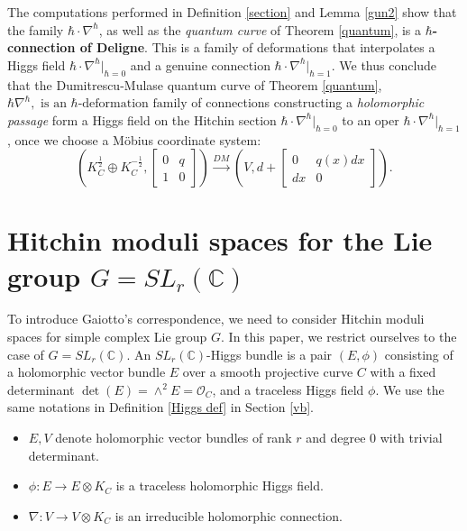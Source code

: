\documentclass[oneside, 11pt]{amsart}
\theoremstyle{definition}
\numberwithin{equation}{subsection}
\begin{document}
The computations performed in Definition \ref{section} and Lemma \ref{gun2} show that the family $\hbar \cdot \nabla^{\hbar}$, as well as the \textit{quantum curve} of Theorem \ref{quantum}, is a \textbf{$\hbar$-connection of Deligne}.  This is a family of deformations that interpolates a Higgs field $\hbar \cdot \nabla^{\hbar}|_{\hbar=0}$  and a genuine 
connection $\hbar \cdot \nabla^{\hbar}|_{\hbar=1}$. We thus conclude that the Dumitrescu-Mulase quantum curve of Theorem \ref{quantum}, ${\hbar\nabla^{\hbar},} \text{ is an } \hbar\text{-deformation family}$ of connections constructing a \textit{holomorphic passage} form a Higgs field on the Hitchin section $\hbar \cdot \nabla^{\hbar}|_{\hbar=0}$ to an oper $\hbar \cdot \nabla^{\hbar}|_{\hbar=1}$, once we
choose a M\"obius coordinate system:
$$\left(K_C^{\frac{1}{2}}\oplus K_C^{-\frac{1}{2}}, \begin{bmatrix}
0&q\\
1&0
\end{bmatrix}
\right)\stackrel{DM}{\rightarrow} \left(V, d+\begin{bmatrix}
0&q(x)dx\\
dx&0
\end{bmatrix}
\right).$$








\section{Hitchin moduli spaces for the Lie group $G = SL_r(\mathbb{C})$}\label{}
To introduce Gaiotto's correspondence, we need to consider  Hitchin moduli spaces for simple complex
Lie group $G$. In this paper, we restrict 
ourselves to the case of 
 $G = SL_r(\mathbb{C})$. An $SL_r(\mathbb{C})$-Higgs bundle is a pair $(E, \phi)$ 
 consisting of a holomorphic vector bundle
 $E$ over a smooth projective curve
 $C$ with a fixed determinant $\det (E)=\wedge^{2} E=\mathcal{O}_C$, and  a traceless Higgs field 
 $\phi$. We use the same notations  in Definition \eqref{Higgs def} in Section \ref{vb}.

\begin{itemize}
\item $E, V$ denote holomorphic vector bundles of rank $r$ and degree $0$ with trivial determinant.
\item $\phi:E\stackrel{}{\rightarrow}E\otimes K_C$ is a traceless holomorphic Higgs field.

\item $\nabla:V\stackrel{}{\rightarrow}V\otimes K_C$ is an irreducible holomorphic connection. 

\setlength{\tabcolsep}{1pt}
\renewcommand{\arraystretch}{1.5}
\end{itemize}
\end{document}
